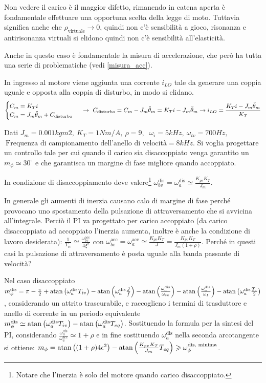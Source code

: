 Non vedere il carico è il maggior difetto, rimanendo in catena aperta è fondamentale effettuare una opportuna scelta della legge di moto.
Tuttavia significa anche che \(\rho_\text{virtuale} \rightarrow 0\), quindi non c'è sensibilità a gioco, risonanza e antirisonanza virtuali si elidono quindi non c'è sensibilità all'elasticità.

Anche in questo caso è fondamentale la misura di accelerazione, che però ha tutta una serie di problematiche (vedi \ref{misura_acc}).

In ingresso al motore viene aggiunta una corrente \(i_{LO}\) tale da generare una coppia uguale e opposta alla coppia di disturbo, in modo si elidano.
\[\begin{cases}
    C_m = K_T i \\
    C_m = J_m \Ddot{\theta}_m + C_\text{disturbo}
\end{cases} \ \rightarrow \ C_\text{disturbo} = C_m - J_m \Ddot{\theta}_m = K_T i - J_m \Ddot{\theta}_m \rightarrow i_{LO} = \frac{K_T i - J_m \Ddot{\theta}_m}{K_T} \]  

Dati \(J_m=0.001 kgm2, \ K_T=1 Nm/A, \ \rho = 9, \) \( \ \omega_i = 5 kHz, \ \omega_{tv}=700 Hz, \) \( \ \text{Frequenza di campionamento dell’anello di velocità} = 8 kHz\).
Si voglia progettare un controllo tale per cui quando il carico sia disaccoppiato venga garantito un \(m_\phi \simeq 30^\circ\) e che garantisca un margine di fase migliore quando accoppiato.

In condizione di disaccoppiamento deve valere\footnote{Notare che l'inerzia è solo del motore quando carico disaccoppiato.} \(\omega_{bv}^\text{dis} = \omega_a^\text{dis} \simeq \frac{K_{pv}K_T}{J_m}\).

In generale gli aumenti di inerzia causano calo di margine di fase perché provocano uno spostamento della pulsazione di attraversamento che si avvicina all'integrale. Perciò il PI va progettato per carico accoppiato (da carico disaccoppiato ad accoppiato l'inerzia aumenta, inoltre è anche la condizione di lavoro desiderata): \(\frac{1}{T_{iv}} \simeq \frac{\omega_{bv}^\text{acc}}{4\xi^2}\) con \(\omega_{bv}^\text{acc} = \omega_{a}^\text{acc} \simeq \frac{K_{pv}K_T}{J} = \frac{K_{pv}K_T}{J_m (1+\rho)}\). {\color{red} Perché in questi casi la pulsazione di attraversamento è posta uguale alla banda passante di velocità?}

Nel caso disaccoppiato \(m_\phi^\text{dis} = \pi - \frac{\pi}{2} + \operatorname{atan}\left( \omega_a^\text{dis} T_{iv} \right) - \operatorname{atan}\left( \omega_a^\text{dis} \frac{J}{f} \right) - \operatorname{atan}\left( \frac{\omega_a^\text{dis}}{\omega_{tv}} \right) - \operatorname{atan}\left( \frac{\omega_a^\text{dis}}{\omega_I} \right) - \operatorname{atan}\left( \omega_a^\text{dis} \frac{T_c}{2} \right) \), considerando un attrito trascurabile, e raccoglieno i termini di trasduttore e anello di corrente in un periodo equivalente \(m_\phi^\text{dis} \simeq \operatorname{atan}\left( \omega_a^\text{dis} T_{iv} \right) - \operatorname{atan}\left( \omega_a^\text{dis} T_{eq} \right) \). Sostituendo la formula per la sintesi del PI, considerando \(\frac{\omega_a^\text{dis}}{\omega_a^\text{acc}} \simeq 1+\rho\) e in fine sostituendo \(\omega_a^\text{dis}\) nella seconda arcotangente si ottiene: \(m_\phi = \operatorname{atan}\left( (1+\rho) 4 \epsilon^2 \right) - \operatorname{atan}\left( \frac{K_{pv}K_T}{J_m} T_{eq} \right) \geqslant \omega_\phi^\text{dis, minima}\).

